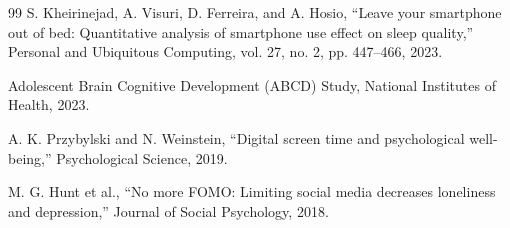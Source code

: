 \documentclass{article}
\begin{document}
\begin{thebibliography}{99}
S. Kheirinejad, A. Visuri, D. Ferreira, and A. Hosio, “Leave your smartphone out of bed: Quantitative analysis of smartphone use effect on sleep quality,” Personal and Ubiquitous Computing, vol. 27, no. 2, pp. 447–466, 2023.

Adolescent Brain Cognitive Development (ABCD) Study, National Institutes of Health, 2023.

A. K. Przybylski and N. Weinstein, ``Digital screen time and psychological well-being,'' Psychological Science, 2019.

M. G. Hunt et al., ``No more FOMO: Limiting social media decreases loneliness and depression,'' Journal of Social Psychology, 2018.


\end{thebibliography}
\end{document}

